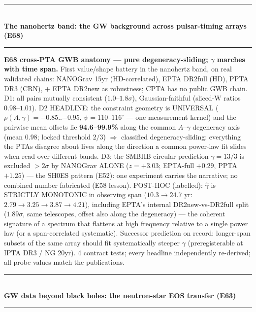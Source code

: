 \documentclass[10pt]{article}
\newcommand{\entry}[2]{\vspace{5pt}\noindent\textbf{#1}\quad #2\par}
\newcommand{\grouphead}[1]{\vspace{9pt}\noindent\rule{\linewidth}{0.4pt}\\[-2pt]{\small\textbf{#1}}\\[-4pt]\rule{\linewidth}{0.4pt}\par\vspace{2pt}}
\begin{document}
\grouphead{The nanohertz band: the GW background across pulsar-timing arrays (E68)}

\entry{E68 cross-PTA GWB anatomy --- pure degeneracy-sliding; $\gamma$ marches with time span.}{
First value/shape battery in the nanohertz band, on real validated chains: NANOGrav 15yr
(HD-correlated), EPTA DR2full (HD), PPTA DR3 (CRN), + EPTA DR2new as robustness; CPTA has no
public GWB chain. D1: all pairs mutually consistent ($1.0$--$1.8\sigma$), Gaussian-faithful
(sliced-W ratios $0.98$--$1.01$). D2 HEADLINE: the constraint geometry is UNIVERSAL
($\rho(A,\gamma) = -0.85$..$-0.95$, $\psi = 110$--$116^\circ$ --- one measurement kernel) and the
pairwise mean offsets lie \textbf{94.6--99.9\%} along the common $A$--$\gamma$ degeneracy axis
(mean $0.98$; locked threshold $2/3$) $\Rightarrow$ classified degeneracy-sliding: everything the
PTAs disagree about lives along the direction a common power-law fit slides when read over
different bands. D3: the SMBHB circular prediction $\gamma = 13/3$ is excluded $>2\sigma$ by
NANOGrav ALONE ($z=+3.03$; EPTA-full $+0.29$, PPTA $+1.25$) --- the SH0ES pattern (E52): one
experiment carries the narrative; no combined number fabricated (E58 lesson). POST-HOC (labelled):
$\hat\gamma$ is STRICTLY MONOTONIC in observing span ($10.3\to24.7$ yr: $2.79\to3.25\to3.87\to4.21$),
including EPTA's internal DR2new-vs-DR2full split ($1.89\sigma$, same telescopes, offset also along
the degeneracy) --- the coherent signature of a spectrum that flattens at high frequency relative to
a single power law (or a span-correlated systematic). Successor prediction on record: longer-span
subsets of the same array should fit systematically steeper $\gamma$ (preregisterable at IPTA DR3 /
NG 20yr). 4 contract tests; every headline independently re-derived; all probe values match the
publications.}

\grouphead{GW data beyond black holes: the neutron-star EOS transfer (E63)}
\end{document}
